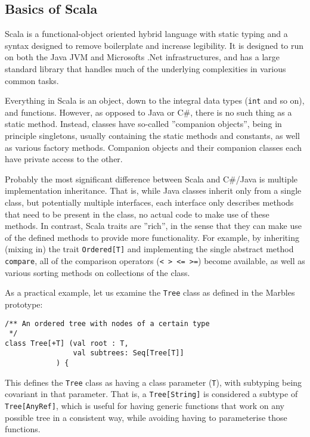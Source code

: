
\subsection{Basics of Scala}

Scala is a functional-object oriented hybrid language with static typing
and a syntax designed to remove boilerplate and increase legibility. It is
designed to run on both the Java JVM and Microsofts .Net infrastructures,
and has a large standard library that handles much of the underlying
complexities in various common tasks. 

Everything in Scala is an object, down to the integral data types
(\texttt{int} and so on), and functions. However, as opposed to Java or C#,
there is no such thing as a static method. Instead, classes have so-called
''companion objects'', being in principle singletons, usually containing
the static methods and constants, as well as various factory methods.
Companion objects and their companion classes each have private access to
the other.

Probably the most significant difference between Scala and C#/Java is
multiple implementation inheritance. That is, while Java classes inherit
only from a single class, but potentially multiple interfaces, each
interface only describes methods that need to be present in the class, no
actual code to make use of these methods. In contrast, Scala traits are
''rich'', in the sense that they can make use of the defined methods to
provide more functionality. For example, by inheriting (mixing in) the
trait \texttt{Ordered[T]} and implementing the single abstract method
\texttt{compare}, all of the comparison operators (\texttt{< > <= >=})
become available, as well as various sorting methods on collections of the
class.

As a practical example, let us examine the \texttt{Tree} class as defined
in the Marbles prototype:

\begin{verbatim}
/** An ordered tree with nodes of a certain type
 */
class Tree[+T] (val root : T, 
		        val subtrees: Seq[Tree[T]]
			) { 
\end{verbatim}

This defines the \texttt{Tree} class as having a class parameter
(\texttt{T}), with subtyping being covariant in that parameter. That is, a
\texttt{Tree[String]} is considered a subtype of \texttt{Tree[AnyRef]},
which is useful for having generic functions that work on any possible tree
in a consistent way, while avoiding having to parameterise those functions.

